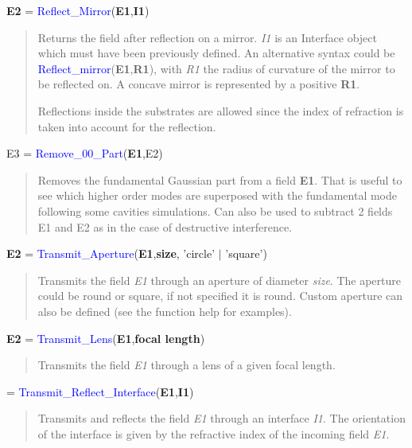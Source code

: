 \noindent \textbf{E2} = \textcolor{blue}{Reflect\_Mirror}(\textbf{E1},\textbf{I1})
\vspace*{-0.2cm}
\begin{quote}
Returns the field after reflection on a mirror. \textsl{I1} is an Interface object which must have been previously defined. An alternative syntax could be \textcolor{blue}{Reflect\_mirror}(\textbf{E1},\textbf{R1}), with \textsl{R1} the radius of curvature of the mirror to be reflected on. A concave mirror is represented by a positive \textbf{R1}.

Reflections inside the substrates are allowed since the index of refraction is taken into account for the reflection.
\end{quote}


\noindent E3 = \textcolor{blue}{ Remove\_00\_Part}(\textbf{E1},E2)
\vspace*{-0.2cm}
\begin{quote}
Removes the fundamental Gaussian part from a field \textbf{E1}. That is useful to see which higher order modes are superposed with the fundamental mode following some cavities simulations. Can also be used to subtract 2 fields E1 and E2 as in the case of destructive interference.
\end{quote}


\noindent \textbf{E2} = \textcolor{blue}{Transmit\_Aperture}(\textbf{E1},\textbf{size}, 'circle' $\mid$ 'square')
\vspace*{-0.2cm}
\begin{quote}
Transmits the field \textsl{E1} through an aperture of diameter \textsl{size}. The aperture could be round or square, if not specified it is round. Custom aperture can also be defined (see the function help for examples).
\end{quote}

\noindent \textbf{E2} = \textcolor{blue}{Transmit\_Lens}(\textbf{E1},\textbf{focal length})
\vspace*{-0.2cm}
\begin{quote}
Transmits the field \textsl{E1} through a lens of a given focal length.
\end{quote}

= \textcolor{blue}{Transmit\_Reflect\_Interface}(\textbf{E1},\textbf{I1})
\vspace*{-0.2cm}
\begin{quote}
Transmits and reflects the field \textsl{E1} through an interface \textsl{I1}. The orientation of the interface is given by the refractive index of the incoming field \textsl{E1}.
\end{quote}

